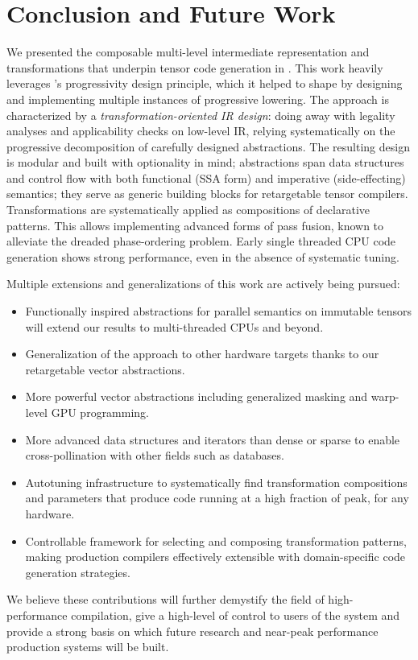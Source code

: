 \section{Conclusion and Future Work}

We presented the composable multi-level intermediate representation and transformations that underpin tensor code generation in \MLIR.
This work heavily leverages \MLIR's progressivity design principle, which it helped to shape by designing and implementing multiple instances of progressive lowering.
The approach is characterized by a \emph{transformation-oriented IR design}: doing away with legality analyses and applicability checks on low-level IR, relying systematically on the progressive decomposition of carefully designed abstractions.
The resulting design is modular and built with optionality in mind; abstractions span data structures and control flow with both functional (SSA form) and imperative (side-effecting) semantics; they serve as generic building blocks for retargetable tensor compilers.
Transformations are systematically applied as compositions of declarative patterns.
This allows implementing advanced forms of pass fusion, known to alleviate the dreaded phase-ordering problem.
Early single threaded CPU code generation shows strong performance, even in the absence of systematic tuning.

Multiple extensions and generalizations of this work are actively being pursued:
\begin{itemize}
    \item Functionally inspired abstractions for parallel semantics on immutable tensors will extend our results to multi-threaded CPUs and beyond.
    \item Generalization of the approach to other hardware targets thanks to our retargetable vector abstractions.
    \item More powerful vector abstractions including generalized masking and warp-level GPU programming.
    \item More advanced data structures and iterators than dense or sparse to enable cross-pollination with other fields such as databases.
    \item Autotuning infrastructure to systematically find transformation compositions and parameters that produce code running at a high fraction of peak, for any hardware.
    \item Controllable framework for selecting and composing transformation patterns, making production compilers effectively extensible with domain-specific code generation strategies.
\end{itemize}

We believe these contributions will further demystify the field of high-performance compilation,
give a high-level of control to users of the system and provide a strong basis on which future research and near-peak performance production systems will be built.
